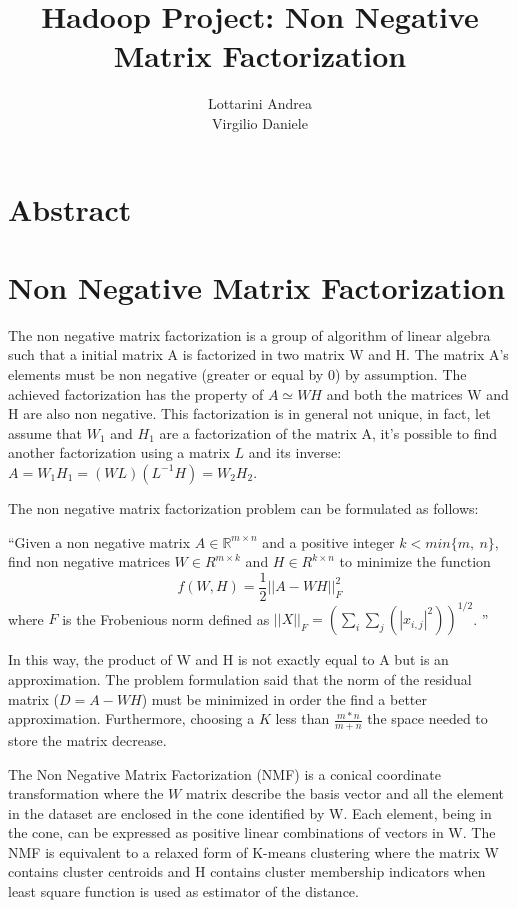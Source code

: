\documentclass[a4paper,12pt]{article}
\title{Hadoop Project: Non Negative Matrix Factorization}
\author{Lottarini Andrea \\ Virgilio Daniele}
\begin{document}
\maketitle

\section{Abstract}


\section{Non Negative Matrix Factorization}

The non negative matrix factorization is a group of algorithm of linear algebra such that a initial matrix A is factorized in two matrix W and H. The matrix A's elements must be non negative (greater or equal by 0) by assumption. The achieved factorization has the property of $ A \simeq W H $ and both the matrices W and H are also non negative. 
This factorization is in general not unique, in fact, let assume that $W_1$ and $H_1$ are a factorization of the matrix A, it's possible to find another factorization using a matrix $L$ and its inverse: $A = W_1 H_1 = ( W L ) (L^{-1} H) = W_2 H_2  $. 

The non negative matrix factorization problem can be formulated as follows:


\begin{center}
  ``Given a non negative matrix $A \in \mathbb{R}^{m×n}$ and a positive integer $k<min\{m,~n\} $, find non 	
  	negative matrices $W \in R^{m×k}$ and $H \in R^{k×n}$ to minimize the function  
  	$$ f ( W , H ) = \frac{1}{2} || A − W H ||_F^2$$ where $F$ is the Frobenious norm defined as
  	$|| X ||_F = ( \sum_i \sum_j( |x_{i,j}|^2 ) )^{1/2}$. ''
\end{center}


In this way, the product of W and H is not exactly equal to A but is an approximation. The problem formulation said that the norm of the residual matrix ($D = A - WH$) must be minimized in order the find a better approximation. Furthermore, choosing a $K$ less than $\frac{m * n}{m + n} $ the space needed to store the matrix decrease.


The Non Negative Matrix Factorization (NMF) is a conical coordinate transformation\cite{Nikolaus07learningthe} where the $W$ matrix describe the basis vector and all the element in the dataset are enclosed in the cone identified by W. Each element, being in the cone, can be expressed as positive linear combinations of vectors in W. The NMF is equivalent to a relaxed form of K-means clustering where the matrix W contains cluster centroids and H contains cluster membership indicators when least square function is used as estimator of the distance.
\end{document}
